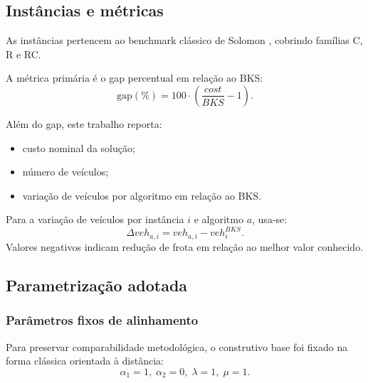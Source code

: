 
\subsection{Instâncias e métricas}

As instâncias pertencem ao benchmark clássico de Solomon \cite{solomon1987algorithms}, cobrindo famílias C, R e RC.

A métrica primária é o gap percentual em relação ao BKS:
\[
\text{gap}(\%) = 100\cdot\left(\frac{cost}{BKS}-1\right).
\]

Além do gap, este trabalho reporta:
\begin{itemize}
  \item custo nominal da solução;
  \item número de veículos;
  \item variação de veículos por algoritmo em relação ao BKS.
\end{itemize}

Para a variação de veículos por instância $i$ e algoritmo $a$, usa-se:
\[
\Delta veh_{a,i} = veh_{a,i} - veh^{BKS}_{i}.
\]
Valores negativos indicam redução de frota em relação ao melhor valor conhecido.

\subsection{Parametrização adotada}

\subsubsection{Parâmetros fixos de alinhamento}

Para preservar comparabilidade metodológica, o construtivo base foi fixado na forma clássica orientada à distância:
\[
\alpha_1=1,\;\alpha_2=0,\;\lambda=1,\;\mu=1.
\]

